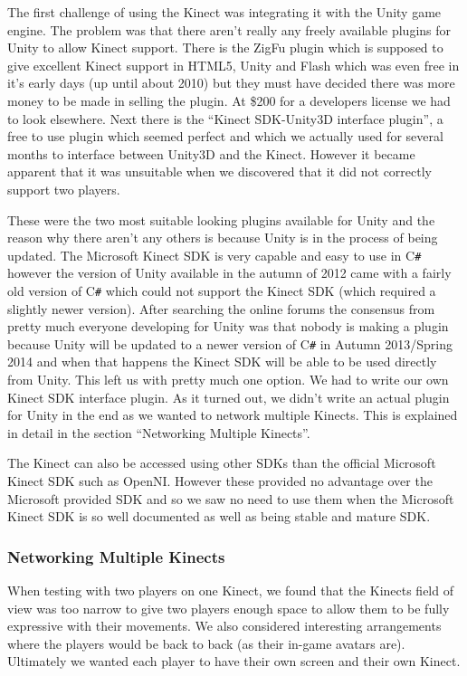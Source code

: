 \documentclass[a4paper,oneside]{memoir}
\begin{document}
				The first challenge of using the Kinect was integrating it with the Unity game engine.
				The problem was that there aren't really any freely available plugins for Unity to allow Kinect support.
				There is the ZigFu plugin which is supposed to give excellent Kinect support in HTML5, Unity and Flash which was even free in it's early days (up until about 2010) but they must have decided there was more money to be made in selling the plugin.
				At \$200 for a developers license we had to look elsewhere.
				Next there is the ``Kinect SDK-Unity3D interface plugin''\cite{Kinect::Adevine1618}, a free to use plugin which seemed perfect and which we actually used for several months to interface between Unity3D and the Kinect.
				However it became apparent that it was unsuitable when we discovered that it did not correctly support two players.

				These were the two most suitable looking plugins available for Unity and the reason why there aren't any others is because Unity is in the process of being updated.
				The Microsoft Kinect SDK is very capable and easy to use in C\texttt{\#} however the version of Unity available in the autumn of 2012 came with a fairly old version of C\texttt{\#} which could not support the Kinect SDK (which required a slightly newer version).
				After searching the online forums the consensus from pretty much everyone developing for Unity was that nobody is making a plugin because Unity will be updated to a newer version of C\texttt{\#} in Autumn 2013/Spring 2014 and when that happens the Kinect SDK will be able to be used directly from Unity.
				This left us with pretty much one option.
				We had to write our own Kinect SDK interface plugin.
				As it turned out, we didn't write an actual plugin for Unity in the end as we wanted to network multiple Kinects. This is explained in detail in the section ``Networking Multiple Kinects''.

				The Kinect can also be accessed using other SDKs than the official Microsoft Kinect SDK such as OpenNI.
				However these provided no advantage over the Microsoft provided SDK and so we saw no need to use them when the Microsoft Kinect SDK is so well documented as well as being stable and mature SDK.
			
			\subsubsection{Networking Multiple Kinects}

				When testing with two players on one Kinect, we found that the Kinects field of view was too narrow to give two players enough space to allow them to be fully expressive with their movements. We also considered interesting arrangements where the players would be back to back (as their in-game avatars are). Ultimately we wanted each player to have their own screen and their own Kinect.
\end{document}
